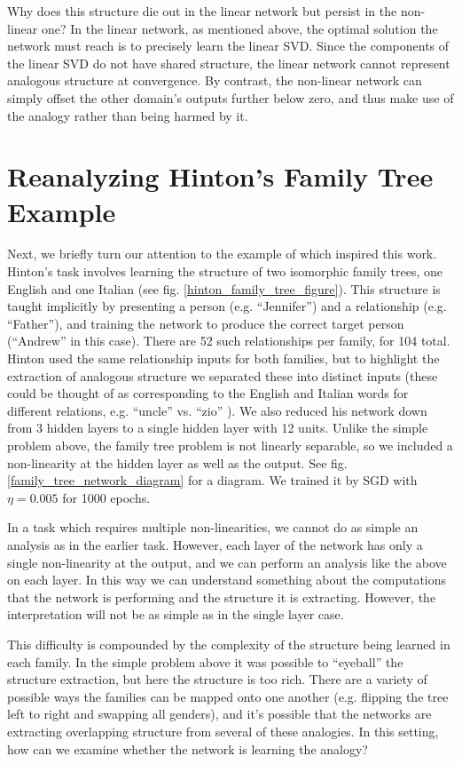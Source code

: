 \documentclass[10pt,letterpaper]{article}
\begin{document}
Why does this structure die out in the linear network but persist in the non-linear one? In the linear network, as mentioned above, the optimal solution the network must reach is to precisely learn the linear SVD. Since the components of the linear SVD do not have shared structure, the linear network cannot represent analogous structure at convergence. By contrast, the non-linear network can simply offset the other domain's outputs further below zero, and thus make use of the analogy rather than being harmed by it. 
\section{Reanalyzing Hinton's Family Tree Example}
Next, we briefly turn our attention to the example of \citet{Hinton1986} which inspired this work. Hinton's task involves learning the structure of two isomorphic family trees, one English and one Italian (see fig. \ref{hinton_family_tree_figure}). This structure is taught implicitly by presenting a person (e.g. ``Jennifer'') and a relationship (e.g. ``Father''), and training the network to produce the correct target person (``Andrew'' in this case). There are 52 such relationships per family, for 104 total. Hinton used the same relationship inputs for both families, but to highlight the extraction of analogous structure we separated these into distinct inputs (these could be thought of as corresponding to the English and Italian words for different relations, e.g. ``uncle'' vs. ``zio'' ). We also reduced his network down from 3 hidden layers to a single hidden layer with 12 units. Unlike the simple problem above, the family tree problem is not linearly separable, so we included a non-linearity at the hidden layer as well as the output. See fig. \ref{family_tree_network_diagram} for a diagram. We trained it by SGD with \(\eta = 0.005\) for 1000 epochs. \par 
In a task which requires multiple non-linearities, we cannot do as simple an analysis as in the earlier task. However, each layer of the network has only a single non-linearity at the output, and we can perform an analysis like the above on each layer. In this way we can understand something about the computations that the network is performing and the structure it is extracting. However, the interpretation will not be as simple as in the single layer case. \par
This difficulty is compounded by the complexity of the structure being learned in each family. In the simple problem above it was possible to ``eyeball'' the structure extraction, but here the structure is too rich. There are a variety of possible ways the families can be mapped onto one another (e.g. flipping the tree left to right and swapping all genders), and it's possible that the networks are extracting overlapping structure from several of these analogies. In this setting, how can we examine whether the network is learning the analogy? \par
\end{document}
